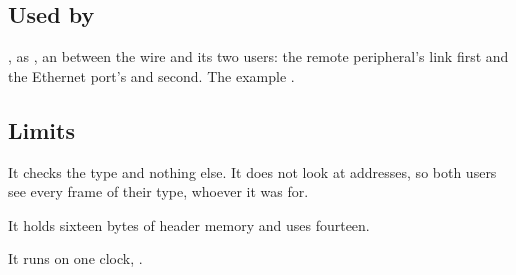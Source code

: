 \subsection*{Used by}

, as , an  between the
wire and its two users: the remote peripheral's link first and the
Ethernet port's  and  second. The
example .

\subsection*{Limits}

It checks the type and nothing else. It does not look at addresses, so
both users see every frame of their type, whoever it was for.

It holds sixteen bytes of header memory and uses fourteen.

It runs on one clock, .

